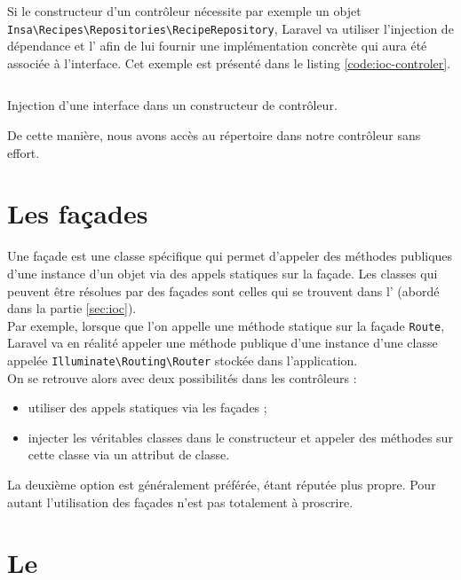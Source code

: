 	Si le constructeur d'un contrôleur nécessite par exemple un objet \verb|Insa\Recipes\Repositories\RecipeRepository|, Laravel va utiliser l'injection de dépendance et l'\ioc{} afin de lui fournir une implémentation concrète qui aura été associée à l'interface. Cet exemple est présenté dans le listing \ref{code:ioc-controler}.
	\begin{listing}[H]
		\inputminted{php}{code/injectionClass.php}
		\caption{Injection d'une interface dans un constructeur de contrôleur.}
		\label{code:ioc-controler}
	\end{listing}

	De cette manière, nous avons accès au répertoire dans notre contrôleur sans effort.

\section{Les façades}
	Une façade est une classe spécifique qui permet d'appeler des méthodes publiques d'une instance d'un objet via des appels statiques sur la façade. Les classes qui peuvent être résolues par des façades sont celles qui se trouvent dans l'\ioc{} (abordé dans la partie \ref{sec:ioc}).\\

	Par exemple, lorsque que l'on appelle une méthode statique sur la façade \verb|Route|, Laravel va en réalité appeler une méthode publique d'une instance d'une classe appelée \verb|Illuminate\Routing\Router| stockée dans l'application.\\

	On se retrouve alors avec deux possibilités dans les contrôleurs :
	\begin{itemize}
		\item utiliser des appels statiques via les façades ;
		\item injecter les véritables classes dans le constructeur et appeler des méthodes sur cette classe via un attribut de classe.
	\end{itemize}
	\vspace{10px}
	La deuxième option est généralement préférée, étant réputée plus propre. Pour autant l'utilisation des façades n'est pas totalement à proscrire.

\section{Le \repositoryPattern}

